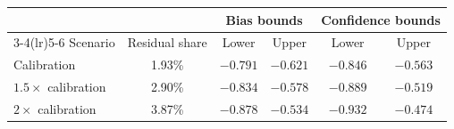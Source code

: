 \begin{tabular}{lccccc}
\toprule
 & & \multicolumn{2}{c}{Bias bounds} & \multicolumn{2}{c}{Confidence bounds}\\
\cmidrule(lr){3-4}\cmidrule(lr){5-6}
Scenario & Residual share & Lower & Upper & Lower & Upper\\
\midrule
Calibration & 1.93\% & $-0.791$ & $-0.621$ & $-0.846$ & $-0.563$\\
$1.5\times$ calibration & 2.90\% & $-0.834$ & $-0.578$ & $-0.889$ & $-0.519$\\
$2\times$ calibration & 3.87\% & $-0.878$ & $-0.534$ & $-0.932$ & $-0.474$\\
\bottomrule
\end{tabular}
